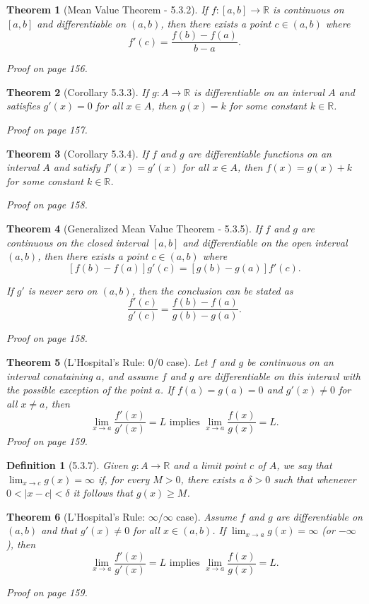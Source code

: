 \documentclass{article}
\newtheorem{definition}{Definition}
\newtheorem{theorem}{Theorem}
\begin{document}
\begin{theorem}[Mean Value Theorem - 5.3.2]
    If $f:[a,b]\rightarrow \mathbb{R}$ is continuous on $[a,b]$ and differentiable on $(a,b)$, then there exists a point $c \in (a,b)$ where \[f'(c) = \frac{f(b)-f(a)}{b-a}.\]
    
    Proof on page 156.
\end{theorem}

\begin{theorem}[Corollary 5.3.3]
    If $g:A\rightarrow \mathbb{R}$ is differentiable on an interval $A$ and satisfies $g'(x) = 0$ for all $x \in A$, then $g(x) = k$ for some constant $k \in \mathbb{R}$.

    Proof on page 157.
\end{theorem}

\begin{theorem}[Corollary 5.3.4]
    If $f$ and $g$ are differentiable functions on an interval $A$ and satisfy $f'(x) = g'(x)$ for all $x \in A$, then $f(x) = g(x) + k$ for some constant $k \in \mathbb{R}$.

    Proof on page 158.
\end{theorem}

\begin{theorem}[Generalized Mean Value Theorem - 5.3.5]
    If $f$ and $g$ are continuous on the closed interval $[a,b]$ and differentiable on the open interval $(a,b)$, then there exists a point $c \in (a,b)$ where \[[f(b)-f(a)]g'(c)=[g(b)-g(a)]f'(c).\]

    If $g'$ is never zero on $(a,b)$, then the conclusion can be stated as \[\frac{f'(c)}{g'(c)} = \frac{f(b)-f(a)}{g(b)-g(a)}.\]

    Proof on page 158.
\end{theorem}

\begin{theorem}[L'Hospital's Rule: 0/0 case]
    Let $f$ and $g$ be continuous on an interval conataining $a$, and assume $f$ and $g$ are differentiable on this interavl with the possible exception of the point $a$. If $f(a) = g(a) = 0$ and $g'(x) \neq 0$ for all $x \neq a$, then \[\lim _{x\rightarrow a}\frac{f'(x)}{g'(x)}=L \text{ implies } \lim _{x\rightarrow a}\frac{f(x)}{g(x)}=L.\]
    Proof on page 159.
\end{theorem}

\begin{definition}[5.3.7]
    Given $g:A\rightarrow \mathbb{R}$ and a limit point $c$ of $A$, we say that $\lim _{x \rightarrow c}g(x) = \infty$ if, for every $M > 0$, there exists a $\delta > 0$ such that whenever $0 < |x-c| < \delta$ it follows that $g(x) \geq M$.
\end{definition}


\begin{theorem}[L'Hospital's Rule: $\infty / \infty$ case]
    Assume $f$ and $g$ are differentiable on $(a,b)$ and that $g'(x) \neq 0$ for all $x \in (a,b)$. If $\lim _{x \rightarrow a} g(x) = \infty $ (or $-\infty$), then \[\lim _{x\rightarrow a}\frac{f'(x)}{g'(x)}=L \text{ implies } \lim _{x\rightarrow a}\frac{f(x)}{g(x)}=L.\]

    Proof on page 159.
\end{theorem}
\end{document}

